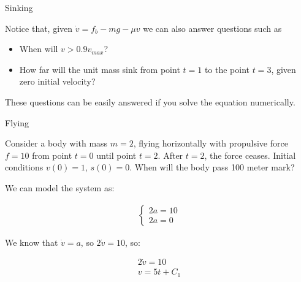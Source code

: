 \documentclass{beamer}
\begin{document}
\begin{frame}{Sinking}
	\begin{flushleft}
		
		Notice that, given $\dot v =  f_b - mg - \mu v$ we can also answer questions such as
		
		\begin{itemize}
			\item When will $v > 0.9 v_{max}$?
			
			\item How far will the unit mass sink from point $t = 1$ to the point $t = 3$, given zero initial velocity?
		\end{itemize}
	
	\bigskip
				
				These questions can be easily answered if you solve the equation numerically.
		
	\end{flushleft}
\end{frame}




\begin{frame}{Flying}
	\begin{flushleft}
		
		Consider a body with mass $m = 2$, flying horizontally with propulsive force $f = 10$ from point $t = 0$ until point $t = 2$. After $t = 2$, the force ceases. Initial conditions $v(0) = 1$, $s(0) = 0$. When will the body pass 100 meter mark?
		
		\bigskip
		
		We can model the system as:
		
		\begin{align}
			\begin{cases}
				2 a = 10 \\
				2 a = 0
			\end{cases}
		\end{align}	
	
	We know that $\dot v = a$, so $2 \dot v = 10$, so:
	
		\begin{align}
				2 \dot v = 10 \\
				v = 5 t + C_1
		\end{align}		
	
		
	\end{flushleft}
\end{frame}
\end{document}
